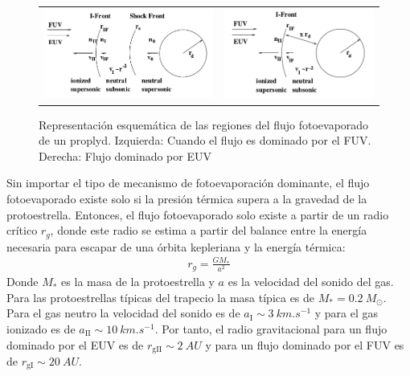 \begin{figure}
  \centering
    \begin{tabular}{cc}
      \includegraphics[width=0.5\linewidth]{./Figures/Johnstone-2} &
      \includegraphics[width=0.5\linewidth]{./Figures/Johnstone-3}
    \end{tabular}
    \label{fig:EUV-FUV-IF}
    \caption{Representación esquemática de las regiones del flujo fotoevaporado de un proplyd. Izquierda: Cuando el flujo es dominado por el FUV. Derecha: Flujo dominado por EUV \citep{Johnstone:1998}}
  \end{figure}
  
  
Sin importar el tipo de mecanismo de fotoevaporación dominante, el flujo fotoevaporado existe solo si la presión térmica supera a la gravedad de la protoestrella. Entonces, el flujo fotoevaporado solo existe a partir de un radio crítico $r_g$, donde este radio se estima a partir del balance entre la energía necesaria para escapar de una órbita kepleriana y la energía térmica:
\begin{align}
  r_g = \frac{GM_*}{a^2}
\end{align}
Donde $M_*$ es la masa de la protoestrella y $a$ es la velocidad del sonido del gas. Para las protoestrellas típicas del trapecio la masa típica es de
$M_* = \SI{0.2}{M_\odot}$. Para el gas neutro la velocidad del sonido es de $a_{\mathrm{I}} \sim \SI{3}{km.s^{-1}}$ y para el gas ionizado es de $a_{\mathrm{II}} \sim \SI{10}{km.s^{-1}}$.
Por tanto, el radio gravitacional para un flujo dominado por el EUV es de $r_{\mathrm{gII}} \sim \SI{2}{AU}$ y para un flujo dominado por el FUV es de $r_{\mathrm{gI}} \sim \SI{20}{AU}$.
